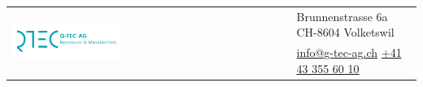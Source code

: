 
\thispagestyle{plain}
\begin{titlepage}
	


\begin{flushleft}
	 
		

	
	\begin{tabularx}{\textwidth}{p{8.5cm}X}
		\multirow{2}{*}{\includegraphics[width=0.4\textwidth]{Bilder/LogoQtecAG}} &\small{\textcolor{CorpColor}{Brunnenstrasse 6a}} \textcolor{CorpColor}{\textbullet} \small{\textcolor{CorpColor}{CH-8604 Volketswil}} \tabularnewline
		 
		 & \small{\href{mailto:info@q-tec-ag.ch}{\color{CorpColor}info@g-tec-ag.ch}} \textcolor{CorpColor}{\textbullet} \small{\href{tel:0041433556010}{\color{CorpColor}+41 43 355 60 10}} \tabularnewline
	\end{tabularx}

\vspace {4cm}

\def\LayoutTextField#1#2{%
	\def\Hy@temp{#1}%
	\ifx\Hy@temp\@empty
	#2%
	\else
	#1 \raisebox{\dimeval{-\height+\ht\strutbox}}{#2}%
	\fi
}
\makeatother


\vspace{1.5cm}


\LARGE{\textbf{\titel}}\\[1.5ex]
\Large{\textbf{\art}}\\[1.5ex]

\large{\fachgebiet}\\[1.5ex]
\vspace {2cm}


\end{flushleft}
\end{titlepage}
